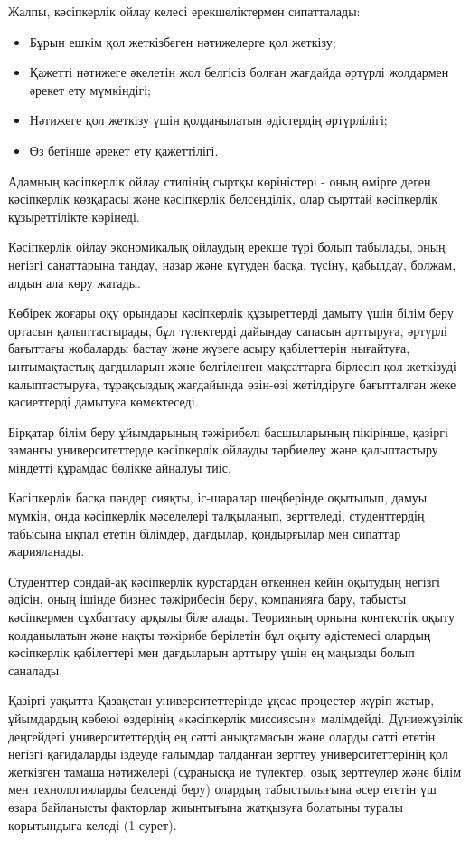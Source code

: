 \begin{multicols}{2}
Жалпы, кәсіпкерлік ойлау келесі ерекшеліктермен сипатталады:

\begin{itemize}[left=0.5cm]
\item
  Бұрын ешкім қол жеткізбеген нәтижелерге қол жеткізу;
\item
  Қажетті нәтижеге әкелетін жол белгісіз болған жағдайда әртүрлі
  жолдармен әрекет ету мүмкіндігі;
\item
  Нәтижеге қол жеткізу үшін қолданылатын әдістердің әртүрлілігі;
\item
  Өз бетінше әрекет ету қажеттілігі.
\end{itemize}

Адамның кәсіпкерлік ойлау стилінің сыртқы көріністері - оның өмірге
деген кәсіпкерлік көзқарасы және кәсіпкерлік белсенділік, олар сырттай
кәсіпкерлік құзыреттілікте көрінеді.

Кәсіпкерлік ойлау экономикалық ойлаудың ерекше түрі болып табылады, оның
негізгі санаттарына таңдау, назар және күтуден басқа, түсіну, қабылдау,
болжам, алдын ала көру жатады.

Көбірек жоғары оқу орындары кәсіпкерлік құзыреттерді дамыту үшін білім
беру ортасын қалыптастырады, бұл түлектерді дайындау сапасын арттыруға,
әртүрлі бағыттағы жобаларды бастау және жүзеге асыру қабілеттерін
нығайтуға, ынтымақтастық дағдыларын және белгіленген мақсаттарға
бірлесіп қол жеткізуді қалыптастыруға, тұрақсыздық жағдайында өзін-өзі
жетілдіруге бағытталған жеке қасиеттерді дамытуға көмектеседі.

Бірқатар білім беру ұйымдарының тәжірибелі басшыларының пікірінше,
қазіргі заманғы университеттерде кәсіпкерлік ойлауды тәрбиелеу және
қалыптастыру міндетті құрамдас бөлікке айналуы тиіс.

Кәсіпкерлік басқа пәндер сияқты, іс-шаралар шеңберінде оқытылып, дамуы
мүмкін, онда кәсіпкерлік мәселелері талқыланып, зерттеледі,
студенттердің табысына ықпал ететін білімдер, дағдылар, қондырғылар мен
сипаттар жарияланады.

Студенттер сондай-ақ кәсіпкерлік курстардан өткеннен кейін оқытудың
негізгі әдісін, оның ішінде бизнес тәжірибесін беру, компанияға бару,
табысты кәсіпкермен сұхбаттасу арқылы біле алады. Теорияның орнына
контекстік оқыту қолданылатын және нақты тәжірибе берілетін бұл оқыту
әдістемесі олардың кәсіпкерлік қабілеттері мен дағдыларын арттыру үшін
ең маңызды болып саналады.

Қазіргі уақытта Қазақстан университеттерінде ұқсас процестер жүріп
жатыр, ұйымдардың көбеюі өздерінің «кәсіпкерлік миссиясын» мәлімдейді.
Дүниежүзілік деңгейдегі университеттердің ең сәтті анықтамасын және
оларды сәтті ететін негізгі қағидаларды іздеуде ғалымдар талданған
зерттеу университеттерінің қол жеткізген тамаша нәтижелері (сұранысқа ие
түлектер, озық зерттеулер және білім мен технологияларды белсенді беру)
олардың табыстылығына әсер ететін үш өзара байланысты факторлар
жиынтығына жатқызуға болатыны туралы қорытындыға келеді (1-сурет).


\end{multicols}
